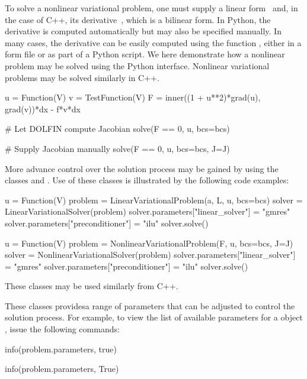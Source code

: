 To solve a nonlinear variational problem, one must supply a linear
form~ and, in the case of C++, its derivative~, which is
a bilinear form. In Python, the derivative is computed automatically
but may also be specified manually. In many cases, the derivative can
be easily computed using the function
, either in a  form file or as part of a Python
script. We here demonstrate how a nonlinear problem may be solved
using the Python interface. Nonlinear variational problems may be
solved similarly in C++.
%
\begin{python}
u  = Function(V)
v  = TestFunction(V)
F  = inner((1 + u**2)*grad(u), grad(v))*dx - f*v*dx

# Let DOLFIN compute Jacobian
solve(F == 0, u, bcs=bcs)

# Supply Jacobian manually
solve(F == 0, u, bcs=bcs, J=J)
\end{python}

More advance control over the solution process may be gained by
using the classes 
and . Use of these classes
is illustrated by the following code examples:
%
\begin{python}
u = Function(V)
problem = LinearVariationalProblem(a, L, u, bcs=bcs)
solver = LinearVariationalSolver(problem)
solver.parameters["linear_solver"] = "gmres"
solver.parameters["preconditioner"] = "ilu"
solver.solve()
\end{python}
%
\begin{python}
u = Function(V)
problem = NonlinearVariationalProblem(F, u, bcs=bcs, J=J)
solver = NonlinearVariationalSolver(problem)
solver.parameters["linear_solver"] = "gmres"
solver.parameters["preconditioner"] = "ilu"
solver.solve()
\end{python}
These classes may be used similarly from C++.

These classes providesa range of parameters that can be adjusted to
control the solution process. For example, to view the list of
available parameters for a 
object , issue the following commands:
%
\begin{c++}
info(problem.parameters, true)
\end{c++}
%
\begin{python}
info(problem.parameters, True)
\end{python}


